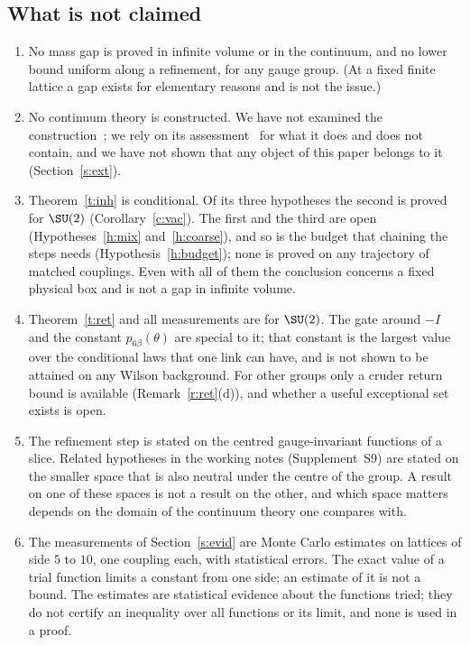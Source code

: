 \subsection{What is not claimed}\label{s:not}
\begin{enumerate}
\item No mass gap is proved in infinite volume or in the continuum, and no lower bound uniform along a
refinement, for any gauge group. (At a fixed finite lattice a gap exists for elementary reasons and is not
the issue.)
\item No continuum theory is constructed. We have not examined the construction~\cite{OAI}; we rely on its
assessment~\cite{YMG} for what it does and does not contain, and we have not shown that any object of this
paper belongs to it (Section~\ref{s:ext}).
\item Theorem~\ref{t:inh} is conditional. Of its three hypotheses the second is proved for $\SU(2)$
(Corollary~\ref{c:vac}). The first and the third are open (Hypotheses~\ref{h:mix} and~\ref{h:coarse}), and so
is the budget that chaining the steps needs (Hypothesis~\ref{h:budget}); none is proved on any trajectory of
matched couplings. Even with all of them the conclusion concerns a fixed physical box and is not a gap in
infinite volume.
\item Theorem~\ref{t:ret} and all measurements are for $\SU(2)$. The gate around $-I$ and the constant $p_{6\beta}(\theta)$
are special to it; that constant is the largest value over the conditional laws that one link can have, and
is not shown to be attained on any Wilson background. For other groups only a cruder return bound is available (Remark~\ref{r:ret}(d)), and
whether a useful exceptional set exists is open.
\item The refinement step is stated on the centred gauge-invariant functions of a slice. Related hypotheses
in the working notes (Supplement~S9) are stated on the smaller space that is also neutral under the centre of the group. A
result on one of these spaces is not a result on the other, and which space matters depends on the domain of
the continuum theory one compares with.
\item The measurements of Section~\ref{s:evid} are Monte Carlo estimates on lattices of side $5$ to $10$,
one coupling each, with statistical errors. The exact value of a trial function limits a constant from one
side; an estimate of it is not a bound. The estimates are statistical evidence about the functions tried; they do
not certify an inequality over all functions or its limit, and none is
used in a proof.
\end{enumerate}

